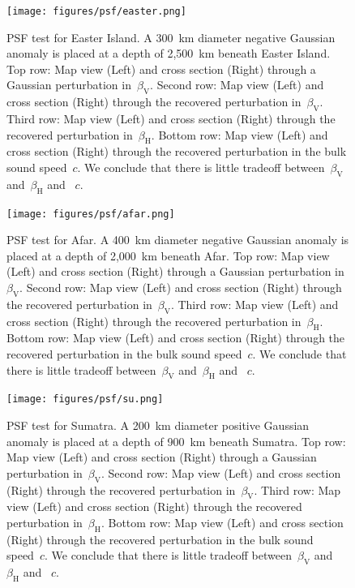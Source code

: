 \documentclass[extra,mreferee]{gji}
\begin{document}
\begin{figure}
  \centering
  \texttt{[image: figures/psf/easter.png]}
  \caption{\small{PSF test for Easter Island.
  A 300~km diameter negative Gaussian anomaly is placed at a depth of 2,500~km beneath Easter Island.
  Top row: Map view (Left) and cross section (Right) through a Gaussian perturbation in~$\beta_\mathrm{V}$.
  Second row: Map view (Left) and cross section (Right) through the recovered perturbation in~$\beta_\mathrm{V}$.
  Third row: Map view (Left) and cross section (Right) through the recovered perturbation in~$\beta_\mathrm{H}$.
  Bottom row: Map view (Left) and cross section (Right) through the recovered perturbation in the bulk sound speed~$c$. We conclude that there is little tradeoff between~$\beta_\mathrm{V}$ and~$\beta_\mathrm{H}$ and ~$c$.}}
  \label{fig:psf_easter}
\end{figure}

\begin{figure}
  \centering
  \texttt{[image: figures/psf/afar.png]}
  \caption{\small{PSF test for Afar.
    A 400~km diameter negative Gaussian anomaly is placed at a depth of 2,000~km beneath Afar.
  Top row: Map view (Left) and cross section (Right) through a Gaussian perturbation in~$\beta_\mathrm{V}$.
  Second row: Map view (Left) and cross section (Right) through the recovered perturbation in~$\beta_\mathrm{V}$.
  Third row: Map view (Left) and cross section (Right) through the recovered perturbation in~$\beta_\mathrm{H}$.
  Bottom row: Map view (Left) and cross section (Right) through the recovered perturbation in the bulk sound speed~$c$. We conclude that there is little tradeoff between~$\beta_\mathrm{V}$ and~$\beta_\mathrm{H}$ and ~$c$.
  }}
  \label{fig:psf_afar}
\end{figure}

\begin{figure}
  \centering
  \texttt{[image: figures/psf/su.png]}
  \caption{\small{PSF test for Sumatra.
    A 200~km diameter positive Gaussian anomaly is placed at a depth of 900~km beneath Sumatra.
  Top row: Map view (Left) and cross section (Right) through a Gaussian perturbation in~$\beta_\mathrm{V}$.
  Second row: Map view (Left) and cross section (Right) through the recovered perturbation in~$\beta_\mathrm{V}$.
  Third row: Map view (Left) and cross section (Right) through the recovered perturbation in~$\beta_\mathrm{H}$.
  Bottom row: Map view (Left) and cross section (Right) through the recovered perturbation in the bulk sound speed~$c$. We conclude that there is little tradeoff between~$\beta_\mathrm{V}$ and~$\beta_\mathrm{H}$ and ~$c$.
  }}
  \label{fig:psf_su}
\end{figure}
\end{document}
